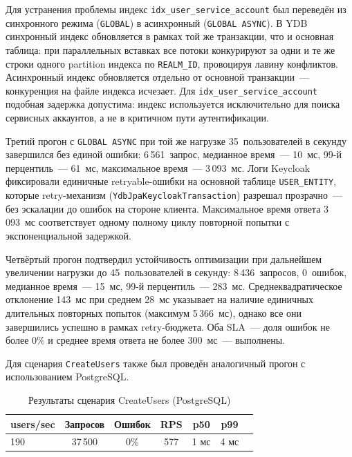 \documentclass[times]{itmo-student-thesis}
\begin{document}
Для устранения проблемы индекс \texttt{idx\_user\_service\_account} был переведён
из синхронного режима (\texttt{GLOBAL}) в асинхронный (\texttt{GLOBAL ASYNC}).
В YDB синхронный индекс обновляется в рамках той же транзакции, что и основная
таблица: при параллельных вставках все потоки конкурируют за одни и те же
строки одного partition индекса по \texttt{REALM\_ID}, провоцируя лавину
конфликтов.
Асинхронный индекс обновляется отдельно от основной транзакции~---
конкуренция на файле индекса исчезает.
Для \texttt{idx\_user\_service\_account} подобная задержка допустима:
индекс используется исключительно для поиска сервисных аккаунтов,
а не в критичном пути аутентификации.

Третий прогон с \texttt{GLOBAL ASYNC} при той же нагрузке 35~пользователей
в секунду завершился без единой ошибки: 6\,561~запрос, медианное время~--- 10~мс,
99-й перцентиль~--- 61~мс, максимальное время~--- 3\,093~мс.
Логи Keycloak фиксировали единичные retryable-ошибки на основной таблице
\texttt{USER\_ENTITY}, которые retry-механизм
(\texttt{YdbJpaKeycloakTransaction}) разрешал прозрачно~---
без эскалации до ошибок на стороне клиента.
Максимальное время ответа 3\,093~мс соответствует одному полному циклу
повторной попытки с экспоненциальной задержкой.

Четвёртый прогон подтвердил устойчивость оптимизации при дальнейшем
увеличении нагрузки до 45~пользователей в секунду: 8\,436~запросов,
0~ошибок, медианное время~--- 15~мс, 99-й перцентиль~--- 283~мс.
Среднеквадратическое отклонение 143~мс при среднем 28~мс указывает на наличие
единичных длительных повторных попыток (максимум 5\,366~мс), однако все они
завершились успешно в рамках retry-бюджета.
Оба SLA~--- доля ошибок не более 0\% и среднее время ответа не более
300~мс~--- выполнены.

Для сценария \texttt{CreateUsers} также был проведён аналогичный прогон с использованием PostgreSQL.

\begin{table}[H]
\centering
\begin{tabular}{|l|c|c|c|c|c|c|}
\hline
\textbf{users/sec} & \textbf{Запросов} & \textbf{Ошибок} & \textbf{RPS} & \textbf{p50} & \textbf{p99} \\
\hline
190 & 37\,500 & 0\% & 577 & 1 мс & 4 мс \\
\hline
\end{tabular}
\caption{Результаты сценария CreateUsers (PostgreSQL)}
\label{tab:load-create-users-postgres}
\end{table}
\end{document}
